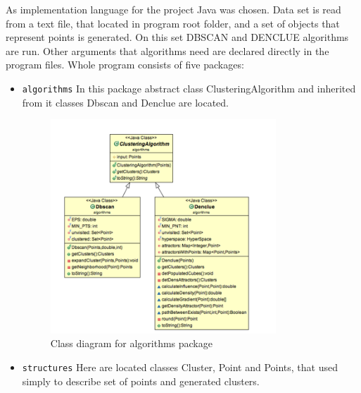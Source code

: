\documentclass[12pt, a4paper, notitlepage, oneside]{article}
\begin{document}
As implementation language for the project Java was chosen. 
Data set is read from a text file, that located in program root folder, 
and a set of objects that represent points is generated. 
On this set DBSCAN and DENCLUE algorithms are run. 
Other arguments that algorithms need are declared directly in the program files. Whole program consists of five packages:
\begin{itemize}
	\item \texttt{algorithms} In this package abstract class ClusteringAlgorithm and inherited from it classes Dbscan and Denclue are located. 

	\begin{figure}[!ht]
 	\centering
	\includegraphics[width=0.8\textwidth]{images/algorithms_package.png}
 	\caption[]
	{Class diagram for algorithms package}
	\end{figure}


	\item \texttt{structures} Here are located classes Cluster, Point and Points, that used simply to describe set of points and generated clusters. 


\end{itemize}
\end{document}
